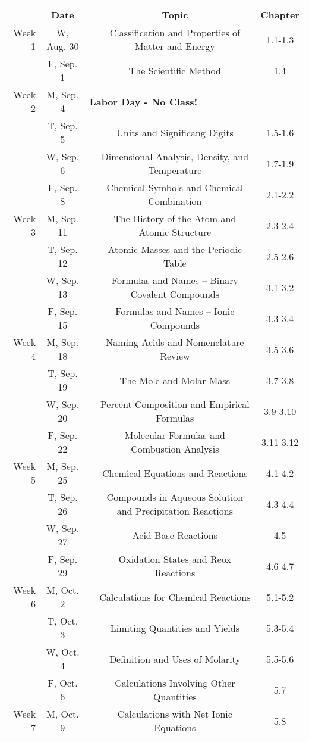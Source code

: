 \begin{tabular}{rcccc}
& Date && Topic & Chapter\\
\midrule
Week 1 & W, Aug. 30&& Classification and Properties of Matter and Energy & 1.1-1.3\\
& F, Sep. 1&& The Scientific Method & 1.4\\
\midrule
Week 2 & M, Sep. 4& \multicolumn{3}{l}{\textbf{Labor Day - No Class!}}\\
& T, Sep. 5&& Units and Significang Digits & 1.5-1.6\\
& W, Sep. 6&& Dimensional Analysis, Density, and Temperature & 1.7-1.9\\
& F, Sep. 8&& Chemical Symbols and Chemical Combination & 2.1-2.2\\
\midrule
Week 3 & M, Sep. 11&& The History of the Atom and Atomic Structure & 2.3-2.4\\
& T, Sep. 12&& Atomic Masses and the Periodic Table & 2.5-2.6\\
& W, Sep. 13&& Formulas and Names -- Binary Covalent Compounds & 3.1-3.2\\
& F, Sep. 15&& Formulas and Names -- Ionic Compounds & 3.3-3.4\\
\midrule
Week 4 & M, Sep. 18&& Naming Acids and Nomenclature Review & 3.5-3.6\\
& T, Sep. 19&& The Mole and Molar Mass & 3.7-3.8\\
& W, Sep. 20&& Percent Composition and Empirical Formulas & 3.9-3.10\\
& F, Sep. 22&& Molecular Formulas and Combustion Analysis & 3.11-3.12\\
\midrule
Week 5 & M, Sep. 25&& Chemical Equations and Reactions & 4.1-4.2\\
& T, Sep. 26&& Compounds in Aqueous Solution and Precipitation Reactions & 4.3-4.4\\
& W, Sep. 27&& Acid-Base Reactions & 4.5\\
& F, Sep. 29&& Oxidation States and Reox Reactions & 4.6-4.7\\
\midrule
Week 6 & M, Oct. 2&& Calculations for Chemical Reactions & 5.1-5.2\\
& T, Oct. 3&& Limiting Quantities and Yields & 5.3-5.4\\
& W, Oct. 4&& Definition and Uses of Molarity & 5.5-5.6\\
& F, Oct. 6&& Calculations Involving Other Quantities & 5.7\\
\midrule
Week 7 & M, Oct. 9&& Calculations with Net Ionic Equations & 5.8\\

\end{tabular}
